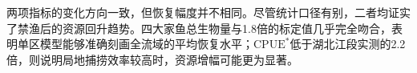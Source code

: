 两项指标的变化方向一致，但恢复幅度并不相同。尽管统计口径有别，二者均证实了禁渔后的资源回升趋势。四大家鱼总生物量与1.8倍的标定值几乎完全吻合，表明单区模型能够准确刻画全流域的平均恢复水平；$\mathrm{CPUE}^*$低于湖北江段实测的2.2倍，则说明局地捕捞效率较高时，资源增幅可能更为显著。
